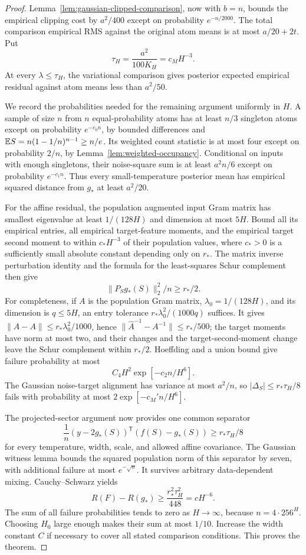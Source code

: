 \begin{proof}
Lemma~\ref{lem:gaussian-clipped-comparison}, now with $b=n$, bounds the empirical clipping cost by $a^2/400$ except on probability $e^{-n/2000}$. The total comparison empirical RMS against the original atom means is at most $a/20+2t$. Put
\[
 \tau_H=\frac{a^2}{100K_H}=c_M H^{-3}.
\]
At every $\lambda\le\tau_H$, the variational comparison gives posterior expected empirical residual against atom means less than $a^2/50$.

We record the probabilities needed for the remaining argument uniformly in $H$. A sample of size $n$ from $n$ equal-probability atoms has at least $n/3$ singleton atoms except on probability $e^{-c_0n}$, by bounded differences and $\mathbb E S=n(1-1/n)^{n-1}\ge n/e$. Its weighted count statistic is at most four except on probability $2/n$, by Lemma~\ref{lem:weighted-occupancy}. Conditional on inputs with enough singletons, their noise-square sum is at least $a^2n/6$ except on probability $e^{-c_1n}$. Thus every small-temperature posterior mean has empirical squared distance from $g_*$ at least $a^2/20$.

For the affine residual, the population augmented input Gram matrix has smallest eigenvalue at least $1/(128H)$ and dimension at most $5H$. Bound all its empirical entries, all empirical target-feature moments, and the empirical target second moment to within $c_*H^{-3}$ of their population values, where $c_*>0$ is a sufficiently small absolute constant depending only on $r_*$. The matrix inverse perturbation identity and the formula for the least-squares Schur complement then give
\[
 \|P_Sg_*(S)\|_2^2/n\ge r_*/2.
\]
For completeness, if $A$ is the population Gram matrix, $\lambda_0=1/(128H)$, and its dimension is $q\le5H$, an entry tolerance $r_*\lambda_0^2/(1000q)$ suffices. It gives $\|\widehat A-A\|\le r_*\lambda_0^2/1000$, hence $\|\widehat A^{-1}-A^{-1}\|\le r_*/500$; the target moments have norm at most two, and their changes and the target-second-moment change leave the Schur complement within $r_*/2$. Hoeffding and a union bound give failure probability at most
\[
 C_4H^2\exp[-c_2 n/H^6].
\]
The Gaussian noise-target alignment has variance at most $a^2/n$, so
$|\Delta_S|\le r_*\tau_H/8$ fails with probability at most $2\exp[-c_M'n/H^6]$.

The projected-sector argument now provides one common separator
\[
 \frac1n(y-2g_*(S))^{\mathsf T}(f(S)-g_*(S))\ge r_*\tau_H/8
\]
for every temperature, width, scale, and allowed affine covariance. The Gaussian witness lemma bounds the squared population norm of this separator by seven, with additional failure at most $e^{-\sqrt n}$. It survives arbitrary data-dependent mixing. Cauchy--Schwarz yields
\[
 R(F)-R(g_*)\ge\frac{r_*^2\tau_H^2}{448}=cH^{-6}.
\]
The sum of all failure probabilities tends to zero as $H\to\infty$, because $n=4\cdot256^H$. Choosing $H_0$ large enough makes their sum at most $1/10$. Increase the width constant $C$ if necessary to cover all stated comparison conditions. This proves the theorem.
\end{proof}

